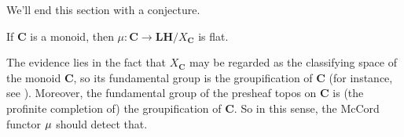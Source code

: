 We'll end this section with a conjecture.

\begin{conjecture}
\label{conj:if C is a monoid then ST is flat}
If $\mathbf{C}$ is a monoid, then $\mu : \mathbf{C} \to \mathbf{LH}/X_{\mathbf{C}}$ is flat.
\end{conjecture}

The evidence lies in the fact that $X_\mathbf{C}$ may be regarded as the classifying space of the monoid $\mathbf{C}$, so its fundamental group is the groupification of $\mathbf{C}$ (for instance, see \cite{lenz2011}). Moreover, the fundamental group of the presheaf topos on $\mathbf{C}$ is (the profinite completion of) the groupification of $\mathbf{C}$. So in this sense, the McCord functor $\operatorname{\mu}$ should detect that.
